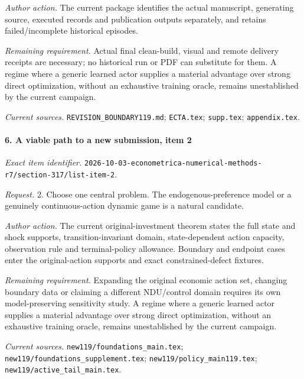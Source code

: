 \par\emph{Author action.} The current package identifies the actual manuscript, generating source, executed records and publication outputs separately, and retains failed/\allowbreak{}incomplete historical episodes.

\par\emph{Remaining requirement.} Actual final clean-build, visual and remote delivery receipts are necessary; no historical run or PDF can substitute for them. A regime where a generic learned actor supplies a material advantage over strong direct optimization, without an exhaustive training oracle, remains unestablished by the current campaign.

\par\emph{Current sources.} \nolinkurl{REVISION_BOUNDARY119.md}; \nolinkurl{ECTA.tex}; \nolinkurl{supp.tex}; \nolinkurl{appendix.tex}.

\paragraph{6. A viable path to a new submission, item 2}

\emph{Exact item identifier.} \nolinkurl{2026-10-03-econometrica-numerical-methods-r7/section-317/list-item-2}.

\par\emph{Request.} 2. Choose one central problem. The endogenous-preference model or a genuinely continuous-action dynamic game is a natural candidate.

\par\emph{Author action.} The current original-investment theorem states the full state and shock supports, transition-invariant domain, state-dependent action capacity, observation rule and terminal-policy allowance. Boundary and endpoint cases enter the original-action supports and exact constrained-defect fixtures.

\par\emph{Remaining requirement.} Expanding the original economic action set, changing boundary data or claiming a different NDU/\allowbreak{}control domain requires its own model-preserving sensitivity study. A regime where a generic learned actor supplies a material advantage over strong direct optimization, without an exhaustive training oracle, remains unestablished by the current campaign.

\par\emph{Current sources.} \nolinkurl{new119/foundations_main.tex}; \nolinkurl{new119/foundations_supplement.tex}; \nolinkurl{new119/policy_main119.tex}; \nolinkurl{new119/active_tail_main.tex}.

